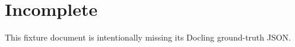 \documentclass{article}
\begin{document}
\section{Incomplete}
This fixture document is intentionally missing its Docling ground-truth JSON.
\end{document}
